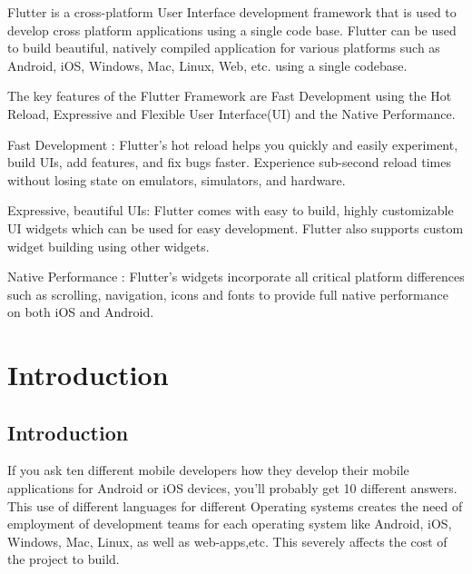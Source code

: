 \documentclass[11pt,a4paper,oneside,openright]{report}
\begin{document}
{{ \hspace{0.2in}Flutter is a cross-platform User Interface development framework that is used to develop cross platform applications using a single code base. Flutter can be used to build beautiful, natively compiled application for various platforms such as Android, iOS, Windows, Mac, Linux, Web, etc. using a single codebase. 

 \hspace{0.2in}The key features of the Flutter Framework are Fast Development using the Hot Reload, Expressive and Flexible User Interface(UI) and the Native Performance.

\hspace{0.2in}Fast Development : Flutter's hot reload helps you quickly and easily experiment, build UIs, add features, and fix bugs faster. Experience sub-second reload times without losing state on emulators, simulators, and hardware.

\hspace{0.2in} Expressive, beautiful UIs: Flutter comes with easy to build, highly customizable UI widgets which can be used for easy development. Flutter also supports custom widget building using other widgets.

\hspace{0.2in} Native Performance : Flutter’s widgets incorporate all critical platform differences such as scrolling, navigation, icons and fonts to provide full native performance on both iOS and Android. 

\newpage
{} %
\tableofcontents
\newpage



\chapter{Introduction}
\label{chap:intro}

\section{Introduction}
\hspace{0.2in} If you ask ten different mobile developers how they develop their mobile applications for Android or iOS devices, you'll probably get 10 different answers. This use of different languages for different Operating systems creates the need of employment of development teams for each operating system like Android, iOS, Windows, Mac, Linux, as well as web-apps,etc. This severely affects the cost of the project to build. 
				
}}
\end{document}
